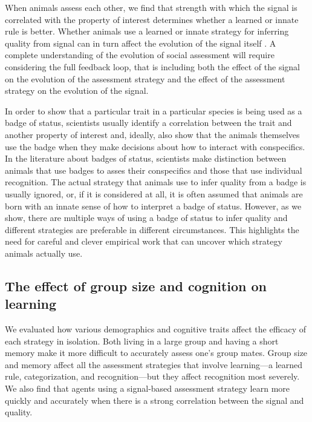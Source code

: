 When animals assess each other, we find that strength with which the signal is correlated with the property of interest determines whether a learned or innate rule is better. Whether animals use a learned or innate strategy for inferring quality from signal can in turn affect the evolution of the signal itself \citep{Kamo:2002vi}. A complete understanding of the evolution of social assessment will require considering the full feedback loop, that is including both the effect of the signal on the evolution of the assessment strategy and the effect of the assessment strategy on the evolution of the signal.

In order to show that a particular trait in a particular species is being used as a badge of status, scientists usually identify a correlation between the trait and another property of interest and, ideally, also show that the animals themselves use the badge when they make decisions about how to interact with conspecifics. In the literature about badges of status, scientists make distinction between animals that use badges to asses their conspecifics and those that use individual recognition. The actual strategy that animals use to infer quality from a badge is usually ignored, or, if it is considered at all, it is often assumed that animals are born with an innate sense of how to interpret a badge of status. However, as we show, there are multiple ways of using a badge of status to infer quality and different strategies are preferable in different circumstances. This highlights the need for careful and clever empirical work that can uncover which strategy animals actually use. %

\subsection*{The effect of group size and cognition on learning} 

We evaluated how various demographics and cognitive traits affect the efficacy of each strategy in isolation. Both living in a large group and having a short memory make it more difficult to accurately assess one's group mates. Group size and memory affect all the assessment strategies that involve learning---a learned rule, categorization, and recognition---but they affect recognition most severely. We also find that agents using a signal-based assessment strategy learn more quickly and accurately when there is a strong correlation between the signal and quality. 

